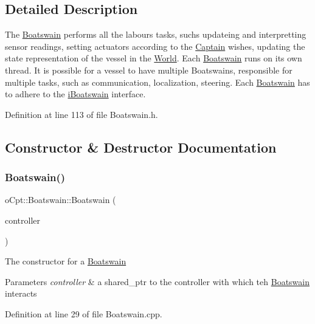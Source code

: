 \subsection{Detailed Description}
The \hyperlink{classo_cpt_1_1_boatswain}{Boatswain} performs all the labours tasks, suchs updateing and interpretting sensor readings, setting actuators according to the \hyperlink{classo_cpt_1_1_captain}{Captain} wishes, updating the state representation of the vessel in the \hyperlink{classo_cpt_1_1_world}{World}. Each \hyperlink{classo_cpt_1_1_boatswain}{Boatswain} runs on its own thread. It is possible for a vessel to have multiple Boatswains, responsible for multiple tasks, such as communication, localization, steering. Each \hyperlink{classo_cpt_1_1_boatswain}{Boatswain} has to adhere to the \hyperlink{classo_cpt_1_1i_boatswain}{i\+Boatswain} interface. 

Definition at line 113 of file Boatswain.\+h.



\subsection{Constructor \& Destructor Documentation}
\hypertarget{classo_cpt_1_1_boatswain_a43e10039b53b8bde7ad2e9780db68949}{}\label{classo_cpt_1_1_boatswain_a43e10039b53b8bde7ad2e9780db68949} 
\subsubsection{\texorpdfstring{Boatswain()}{Boatswain()}}
{\footnotesize\ttfamily o\+Cpt\+::\+Boatswain\+::\+Boatswain (\begin{DoxyParamCaption}\item[{\hyperlink{classo_cpt_1_1i_controller_a6d89a95cd6ad68bb74adfaca2f36370f}{i\+Controller\+::ptr}}]{controller }\end{DoxyParamCaption})}

The constructor for a \hyperlink{classo_cpt_1_1_boatswain}{Boatswain} 
\begin{DoxyParams}{Parameters}
{\em controller} & a shared\+\_\+ptr to the controller with which teh \hyperlink{classo_cpt_1_1_boatswain}{Boatswain} interacts \\
\hline
\end{DoxyParams}


Definition at line 29 of file Boatswain.\+cpp.

